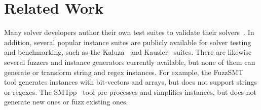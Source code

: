\section{Related Work}

Many solver developers author their own test suites to
validate their solvers~\cite{cvc4-tests,z3str3-tests,z3str2-tests}. In
addition, several popular instance suites are publicly available for
solver testing and benchmarking, such as the Kaluza~\cite{kaluza} and
Kausler~\cite{kausler} suites. There are likewise several fuzzers and
instance generators currently available, but none of them can generate
or transform string and regex instances. For example, the
FuzzSMT~\cite{fuzzsmt} tool generates \smt{} instances with bit-vectors
and arrays, but does not support strings or regexes. The
SMTpp~\cite{smtpp} tool pre-processes and simplifies instances, but
does not generate new ones or fuzz existing ones.
